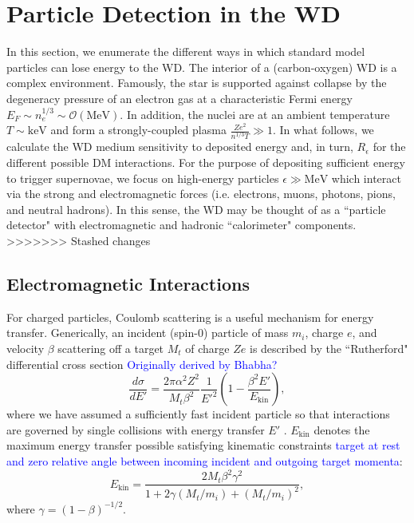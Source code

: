 \documentclass[twocolumn,showpacs,preprintnumbers,amsmath,amssymb,prl]{revtex4}
\newcommand{\OO}{\mathcal{O}}
\def\r{\right)}
\def\l{\left(}
\begin{document}
\section{Particle Detection in the WD}
In this section, we enumerate the different ways in which standard model particles can lose energy to the WD. The interior of a (carbon-oxygen) WD is a complex environment. Famously, the star is supported against collapse by the degeneracy pressure of an electron gas at a characteristic Fermi energy $E_F \sim n_e^{1/3} \sim \OO(\text{MeV})$. In addition, the nuclei are at an ambient temperature $T \sim \text{keV}$ and form a strongly-coupled plasma $\frac{Z e^2}{n^{1/3} T} \gg 1$. In what follows, we calculate the WD medium sensitivity to deposited energy and, in turn, $R_\epsilon$ for the different possible DM interactions. For the purpose of depositing sufficient energy to trigger supernovae, we focus on high-energy particles $\epsilon \gg \text{MeV}$ which interact via the strong and electromagnetic forces (i.e. electrons, muons, photons, pions, and neutral hadrons). In this sense, the WD may be thought of as a ``particle detector" with electromagnetic and hadronic ``calorimeter" components.  
>>>>>>> Stashed changes

\subsection{Electromagnetic Interactions}

For charged particles, Coulomb scattering is a useful mechanism for energy transfer. Generically, an incident (spin-0) particle of mass $m_i$, charge $e$, and velocity $\beta$ scattering off a target $M_t$ of charge $Ze$ is described by the ``Rutherford" differential cross section \textcolor{blue}{Originally derived by Bhabha?}
\begin{equation}
\label{eq:rutherford}
\frac{d \sigma}{dE'} = \frac{2 \pi  \alpha^2 Z^2}{M_t \beta^2} \frac{1}{E'^2} \l1- \frac{\beta^2 E'}{E_{\text{kin}}}\r,
 \end{equation}
where we have assumed a sufficiently fast incident particle so that interactions are governed by single collisions with energy transfer $E'$ \cite{Agashe:2014kda}. $E_{\text{kin}}$ denotes the maximum energy transfer possible satisfying kinematic constraints \textcolor{blue}{target at rest and zero relative angle between incoming incident and outgoing target momenta}:
\begin{equation}
E_{\text{kin}} = \frac{2 M_t \beta^2 \gamma^2}{1+ 2\gamma(M_t/m_i) +(M_t/m_i)^2},
\end{equation}
where $\gamma = (1-\beta)^{-1/2}$.
\end{document}
